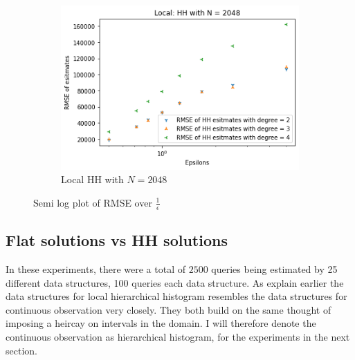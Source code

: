 \documentclass[11pt]{article}
\theoremstyle{definition}
\begin{document}
\begin{figure}[H]
\begin{subfigure}[b]{0.3\textwidth}
         \includegraphics[width=\textwidth]{figures/hh_loc_epsi/hh_lin_N=2048.png}
         \caption{Local HH with $N=2048$}
         \label{fig:f2}
     \end{subfigure}
        \caption{Semi log plot of RMSE over $\frac{1}{\epsilon}$}
        \label{fig:esp_loc_hh2}
\end{figure}


\newpage\subsection{Flat solutions vs HH solutions}
In these experiments, there were a total of $2500$ queries being estimated by 25 different data structures, 100 queries each data structure. As explain earlier the data structures for local hierarchical histogram resembles the data structures for continuous observation very closely. They both build on the same thought of imposing a heircay on intervals in the domain. I will therefore denote the continuous observation as hierarchical histogram, for the experiments in the next section.
\end{document}
